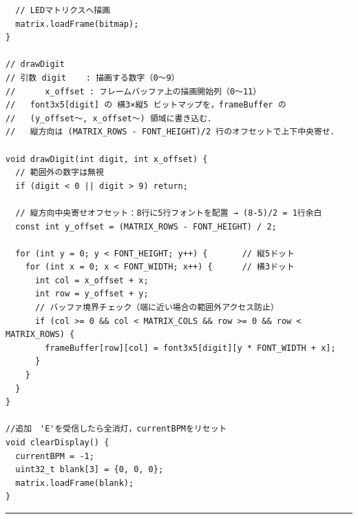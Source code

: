 \documentclass[uplatex,dvipdfmx,a4paper,11pt]{jsarticle}
\newcommand{\sectionrule}{\par\medskip\noindent\rule{\linewidth}{0.6pt}\par\medskip}
\begin{document}
\begin{lstlisting}
  // LEDマトリクスへ描画
  matrix.loadFrame(bitmap);
}

// drawDigit
// 引数 digit    : 描画する数字（0〜9）
//      x_offset : フレームバッファ上の描画開始列（0〜11）
//   font3x5[digit] の 横3×縦5 ビットマップを，frameBuffer の
//   (y_offset〜, x_offset〜) 領域に書き込む．
//   縦方向は (MATRIX_ROWS - FONT_HEIGHT)/2 行のオフセットで上下中央寄せ．

void drawDigit(int digit, int x_offset) {
  // 範囲外の数字は無視
  if (digit < 0 || digit > 9) return;

  // 縦方向中央寄せオフセット：8行に5行フォントを配置 → (8-5)/2 = 1行余白
  const int y_offset = (MATRIX_ROWS - FONT_HEIGHT) / 2;

  for (int y = 0; y < FONT_HEIGHT; y++) {       // 縦5ドット
    for (int x = 0; x < FONT_WIDTH; x++) {      // 横3ドット
      int col = x_offset + x;
      int row = y_offset + y;
      // バッファ境界チェック（端に近い場合の範囲外アクセス防止）
      if (col >= 0 && col < MATRIX_COLS && row >= 0 && row < MATRIX_ROWS) {
        frameBuffer[row][col] = font3x5[digit][y * FONT_WIDTH + x];
      }
    }
  }
}

//追加　'E'を受信したら全消灯，currentBPMをリセット
void clearDisplay() {
  currentBPM = -1;
  uint32_t blank[3] = {0, 0, 0};
  matrix.loadFrame(blank);
}
\end{lstlisting}

\sectionrule
\end{document}
